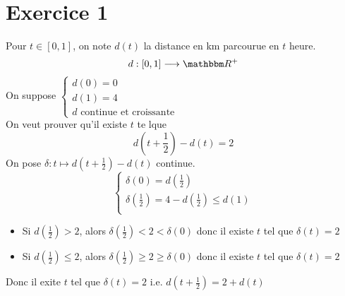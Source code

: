 \part{Exercice 1}

Pour $t \in [0,1]$, on note $d(t)$ la distance en km parcourue en $t$ heure.
\[
	d: [0,1] \longrightarrow \R^+
\]
On suppose $\begin{cases}
	d(0) = 0\\
	d(1) = 4\\
	d \text{ continue et croissante}
\end{cases}$ \\
On veut prouver qu'il existe $t$ te lque \[
	d\left( t+\frac{1}{2} \right) - d(t) = 2
\]
On pose $\delta: t \mapsto d\left( t+\frac{1}{2} \right) - d(t)$ continue.\\

\[
	\begin{cases}
		\delta(0) = d\left( \frac{1}{2} \right)\\
		\delta\left( \frac{1}{2} \right) = 4 - d\left( \frac{1}{2} \right) \le d(1)\\
	\end{cases}
\]
\begin{itemize}
	\item Si $d\left( \frac{1}{2} \right) > 2$, alors $\delta\left( \frac{1}{2} \right) < 2 < \delta(0)$ donc il existe $t$ tel que $\delta(t) = 2$ \\
	\item Si $d\left( \frac{1}{2} \right) \le  2$, alors $\delta\left( \frac{1}{2} \right) \ge 2 \ge \delta(0)$ donc il existe $t$ tel que $\delta(t) = 2$ \\
\end{itemize}

Donc il exite $t$ tel que $\delta(t) = 2$ i.e. $d\left( t+\frac{1}{2} \right) = 2 + d(t)$
